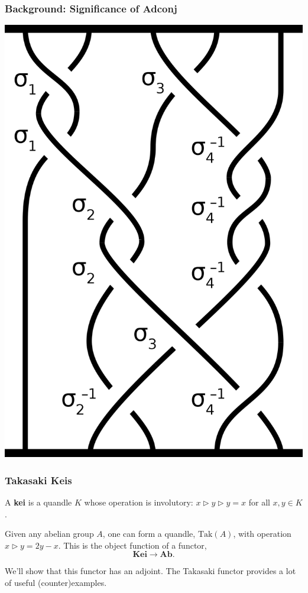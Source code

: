 \documentclass[10pt]{beamer}
\newcommand{\thru}{\rhd} %
\newcommand{\Tak}{\mathrm{Tak}}
\theoremstyle{plain}
\begin{document}
    \begin{frame}
    
        \frametitle{Background: Significance of Adconj}
        
        \includegraphics[scale = 0.1]{figures/braidGroup.png}

    \end{frame}

    \begin{frame}
        \frametitle{Takasaki Keis}

        \begin{definition}\cite{joyce1982classifying}
            A \textbf{kei} is a quandle $K$ whose operation is involutory: $ x\thru y \thru y = x $ for all $x,y\in K$.
        \end{definition}

        \begin{definition}
            Given any abelian group $A$, one can form a quandle, $\Tak(A)$, with operation $ x\thru y = 2y - x $. This is the object function of a functor,
            \[
                \mathbf{Kei}\to \mathbf{Ab}.
                \]
        \end{definition}

        We'll show that this functor has an adjoint. The Takasaki functor provides a lot of useful (counter)examples.

        
    \end{frame}
\end{document}
